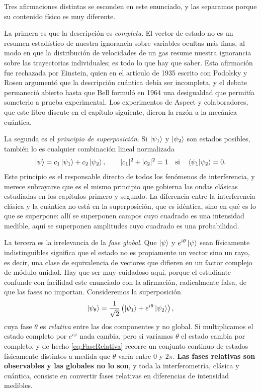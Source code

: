         Tres afirmaciones distintas se esconden en este enunciado, y las separamos porque su contenido físico es muy diferente.

        La primera es que la descripción es \textit{completa}. El vector de estado no es un resumen estadístico de nuestra ignorancia sobre variables ocultas más finas, al modo en que la distribución de velocidades de un gas resume nuestra ignorancia sobre las trayectorias individuales; es todo lo que hay que saber. Esta afirmación fue rechazada por Einstein, quien en el artículo de 1935 escrito con Podolsky y Rosen argumentó que la descripción cuántica debía ser incompleta, y el debate permaneció abierto hasta que Bell formuló en 1964 una desigualdad que permitía someterlo a prueba experimental. Los experimentos de Aspect y colaboradores, que este libro discute en el capítulo siguiente, dieron la razón a la mecánica cuántica.

        La segunda es el \textit{principio de superposición}. Si $\ket{\psi_{1}}$ y $\ket{\psi_{2}}$ son estados posibles, también lo es cualquier combinación lineal normalizada
        \begin{equation}\label{eq:Superposicion}
            \ket{\psi} = c_{1}\ket{\psi_{1}} + c_{2}\ket{\psi_{2}},
            \qquad
            |c_{1}|^{2} + |c_{2}|^{2} = 1 \quad\text{si}\quad \braket{\psi_{1}|\psi_{2}} = 0 .
        \end{equation}
        Este principio es el responsable directo de todos los fenómenos de interferencia, y merece subrayarse que es el mismo principio que gobierna las ondas clásicas estudiadas en los capítulos primero y segundo. La diferencia entre la interferencia clásica y la cuántica no está en la superposición, que es idéntica, sino en qué es lo que se superpone: allí se superponen campos cuyo cuadrado es una intensidad medible, aquí se superponen amplitudes cuyo cuadrado es una probabilidad.

        La tercera es la irrelevancia de la \textit{fase global}. Que $\ket{\psi}$ y $e^{i\theta}\ket{\psi}$ sean físicamente indistinguibles significa que el estado no es propiamente un vector sino un rayo, es decir, una clase de equivalencia de vectores que difieren en un factor complejo de módulo unidad. Hay que ser muy cuidadoso aquí, porque el estudiante confunde con facilidad este enunciado con la afirmación, radicalmente falsa, de que las fases no importan. Consideremos la superposición
        \begin{equation}\label{eq:FaseRelativa}
            \ket{\psi_{\theta}} = \frac{1}{\sqrt{2}}\left(\ket{\psi_{1}} + e^{i\theta}\ket{\psi_{2}}\right),
        \end{equation}
        cuya fase $\theta$ es \textit{relativa} entre las dos componentes y no global. Si multiplicamos el estado completo por $e^{i\varphi}$ nada cambia, pero si variamos $\theta$ el estado cambia por completo, y de hecho \eqref{eq:FaseRelativa} recorre un conjunto continuo de estados físicamente distintos a medida que $\theta$ varía entre $0$ y $2\pi$. \textbf{Las fases relativas son observables y las globales no lo son}, y toda la interferometría, clásica y cuántica, consiste en convertir fases relativas en diferencias de intensidad medibles.

